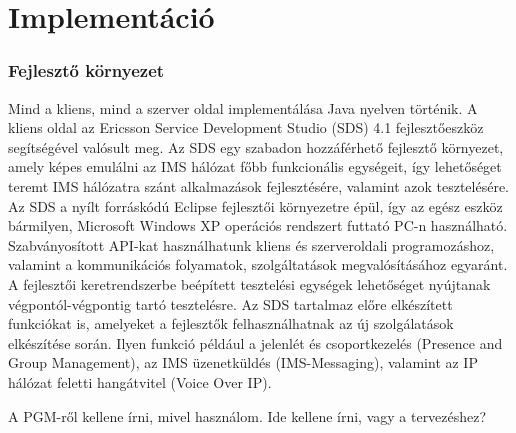 \section{Implementáció}

\subsubsection{Fejlesztő környezet}

Mind a kliens, mind a szerver oldal implementálása Java nyelven történik. A kliens oldal az Ericsson Service Development Studio (SDS) 4.1 fej\-lesz\-tő\-esz\-köz segítségével valósult meg. Az SDS egy szabadon hozzáférhető fejlesztő környezet, amely képes emulálni az IMS hálózat főbb funkcionális egységeit, így lehetőséget teremt IMS hálózatra szánt alkalmazások fejlesztésére, valamint azok tesztelésére. Az SDS a nyílt forráskódú Eclipse fejlesztői környezetre épül, így az egész eszköz bármilyen, Microsoft Windows XP operációs rendszert futtató PC-n használható. Szabványosított API-kat használhatunk kliens és szer\-ver\-ol\-da\-li programozáshoz, valamint a kommunikációs folyamatok, szolgáltatások megvalósításához egyaránt. A fejlesztői keretrendszerbe beépített tesztelési egységek lehetőséget nyújtanak végpontól-végpontig tartó tesztelésre. Az SDS tartalmaz előre elkészített funkciókat is, amelyeket a fejlesztők felhasználhatnak az új szolgálatások elkészítése során. Ilyen funkció például a jelenlét és csoportkezelés (Presence and Group Management), az IMS üzenetküldés (IMS-Messaging), valamint az IP hálózat feletti hangátvitel (Voice Over IP).

{\color{red}A PGM-ről kellene írni, mivel használom. Ide kellene írni, vagy a tervezéshez?}
